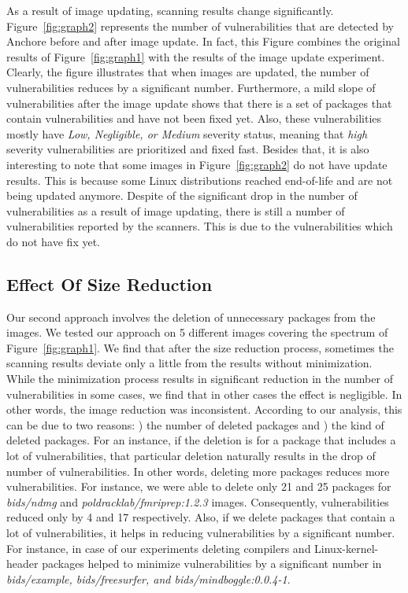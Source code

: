 \documentclass[a4paper,num-refs]{oup-contemporary}
\newcommand{\rom}[1]{\lowercase\expandafter{\romannumeral #1\relax}}
\begin{document}
As a result of image updating,
scanning results change significantly.
Figure~\ref{fig:graph2} represents the number of vulnerabilities that are detected by Anchore before and after 
image update. 
In fact, this Figure combines the original results of Figure~\ref{fig:graph1} with the results of the image update
experiment.
Clearly, the figure illustrates that when images are updated, the number of vulnerabilities reduces by a
significant number. Furthermore, a mild slope of vulnerabilities after the image update shows that
there is a set of packages that contain vulnerabilities and have not been fixed yet. Also, these
vulnerabilities mostly have \textit{Low, Negligible, or Medium} severity status, meaning that
\textit{high} severity vulnerabilities are prioritized and fixed fast.
Besides that, it is also interesting to note that some images in Figure~\ref{fig:graph2}
do not have update results. This is because some Linux distributions reached end-of-life and
are not being updated anymore.
Despite of the significant drop in the number of vulnerabilities as a result of image updating,
there is still a number of vulnerabilities reported by the scanners. This is due to the
vulnerabilities which do not have fix yet.

\subsection{Effect Of Size Reduction}

Our second approach involves the deletion of unnecessary packages from the images.
We tested our approach on 5 different images covering the spectrum of Figure~\ref{fig:graph1}. We find that
after the size reduction process, sometimes the scanning results deviate only a little from the results
without minimization. While the minimization process results in significant reduction
in the number of vulnerabilities in some cases, we find that in other cases the effect
is negligible. In other words, the image reduction was inconsistent.
According to our analysis, this can be due to two reasons: \rom{1}) the number of
deleted packages
and \rom{2}) the kind of deleted packages. 
For an instance, if the deletion is for a package that includes a lot of vulnerabilities,
that particular deletion naturally results in the drop of number of vulnerabilities.
In other
words, deleting more packages reduces more vulnerabilities. 
For instance, we were able to delete only 21 and 25 packages for 
\textit{bids/ndmg} and \textit{poldracklab/fmriprep:1.2.3} images. Consequently, vulnerabilities
reduced only by 4 and 17 respectively. 
Also, if we delete packages that contain a lot of vulnerabilities, it helps in reducing
vulnerabilities by a significant number. For instance, in case of our experiments
deleting compilers and Linux-kernel-header packages helped to minimize vulnerabilities
by a significant number in \textit{bids/example, bids/freesurfer, and bids/mindboggle:0.0.4-1}. 
\end{document}
